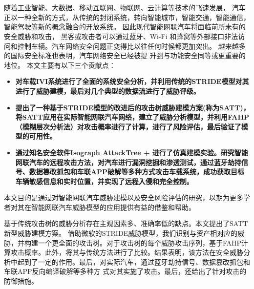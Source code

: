 \vspace{-2.5cm}
\chapter*{\xiaosan {}}
\hspace{-0.5cm}

随着工业智能、大数据、移动互联网、物联网、云计算等技术的飞速发展，
汽车正以一种全新的方式，从传统的封闭系统，转向智能城市，智能交通，智能通信，智能驾驶等新的概念融合的开放系统。
因此现代智能网联汽车将面临前所未有的安全威胁和攻击，
黑客或攻击者可以通过蓝牙、Wi-Fi 和蜂窝等外部接口非法访问和控制车辆。汽车网络安全问题正变得比以往任何时候都更加突出。
越来越多的国际安全标准也表明，汽车网络安全已经被提
升到与功能安全同等或更重要的地位。
本文主要有以下三个贡献点：
\begin{itemize}
    \item \textbf{对车载IVI系统进行了全面的系统安全分析，并利用传统的STRIDE模型对其进行了威胁建模，最后对几个典型的数据流进行了威胁评级。}
    \item \textbf{提出了一种基于STRIDE模型的改进后的攻击树威胁建模方案(称为SATT)，将SATT应用在实际智能网联汽车网络，建立了威胁分析模型，并利用FAHP（模糊层次分析法）对攻击概率进行了计算，进行了风险评估，最后验证了模型的可用性。}
    \item \textbf{通过知名安全软件Isograph AttackTree + 进行了仿真建模实验。研究智能网联汽车的远程攻击方法，对汽车进行漏洞挖掘和渗透测试，通过蓝牙劫持信号、数据篡改抓包和车联APP破解等多种方式攻击车载系统，成功获取目标车辆敏感信息和实时位置，并实现了远程入侵和完全控制。}    
\end{itemize}

本文目的是通过对智能网联汽车威胁建模以及安全风险评估的研究，以期为更多学者对其在智能网联汽车威胁模型的应用提供有益的借鉴和帮助。

基于传统攻击树的威胁分析存在主观因素多、准确率低的缺点。本文提出了SATT新型威胁建模方案。
借助微软的STRIDE威胁模型，我们识别与资产相对应的威胁，并构建一个更全面的攻击树。对于攻击树的每个威胁攻击序列，基于FAHP计算攻击概率。此外，将其与传统方法进行了比较。结果表明，该方法在安全威胁分析中起到了一定的作用。最后，对实际汽车，通过蓝牙劫持信号、数据篡改抓包和车联APP反向编译破解等多种方
式对其实施了攻击。最后，还给出了针对攻击的防御措施。
\newline
{} 